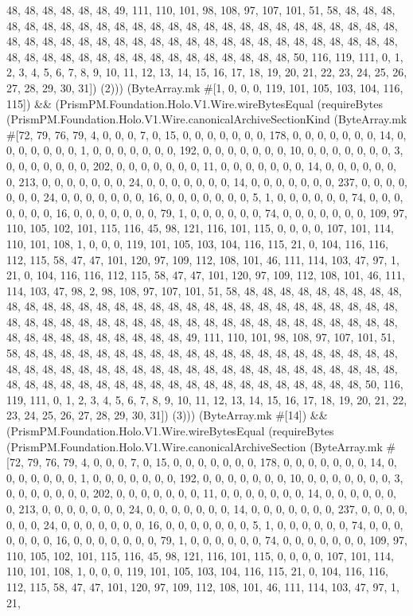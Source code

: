 \documentclass[11pt]{article}
\begin{document}
48, 48, 48, 48, 48, 48, 49, 111, 110, 101, 98, 108, 97, 107, 101, 51, 58, 48, 48, 48, 48, 48, 48, 48, 48, 48, 48, 48, 48, 48, 48, 48, 48, 48, 48, 48, 48, 48, 48, 48, 48, 48, 48, 48, 48, 48, 48, 48, 48, 48, 48, 48, 48, 48, 48, 48, 48, 48, 48, 48, 48, 48, 48, 48, 48, 48, 48, 48, 48, 48, 48, 48, 48, 48, 48, 48, 48, 48, 48, 48, 50, 116, 119, 111, 0, 1, 2, 3, 4, 5, 6, 7, 8, 9, 10, 11, 12, 13, 14, 15, 16, 17, 18, 19, 20, 21, 22, 23, 24, 25, 26, 27, 28, 29, 30, 31]) (2))) (ByteArray.mk \#[1, 0, 0, 0, 119, 101, 105, 103, 104, 116, 115]) \&\& (PrismPM.Foundation.Holo.V1.Wire.wireBytesEqual (requireBytes (PrismPM.Foundation.Holo.V1.Wire.canonicalArchiveSectionKind (ByteArray.mk \#[72, 79, 76, 79, 4, 0, 0, 0, 7, 0, 15, 0, 0, 0, 0, 0, 0, 0, 178, 0, 0, 0, 0, 0, 0, 0, 14, 0, 0, 0, 0, 0, 0, 0, 1, 0, 0, 0, 0, 0, 0, 0, 192, 0, 0, 0, 0, 0, 0, 0, 10, 0, 0, 0, 0, 0, 0, 0, 3, 0, 0, 0, 0, 0, 0, 0, 202, 0, 0, 0, 0, 0, 0, 0, 11, 0, 0, 0, 0, 0, 0, 0, 14, 0, 0, 0, 0, 0, 0, 0, 213, 0, 0, 0, 0, 0, 0, 0, 24, 0, 0, 0, 0, 0, 0, 0, 14, 0, 0, 0, 0, 0, 0, 0, 237, 0, 0, 0, 0, 0, 0, 0, 24, 0, 0, 0, 0, 0, 0, 0, 16, 0, 0, 0, 0, 0, 0, 0, 5, 1, 0, 0, 0, 0, 0, 0, 74, 0, 0, 0, 0, 0, 0, 0, 16, 0, 0, 0, 0, 0, 0, 0, 79, 1, 0, 0, 0, 0, 0, 0, 74, 0, 0, 0, 0, 0, 0, 0, 109, 97, 110, 105, 102, 101, 115, 116, 45, 98, 121, 116, 101, 115, 0, 0, 0, 0, 107, 101, 114, 110, 101, 108, 1, 0, 0, 0, 119, 101, 105, 103, 104, 116, 115, 21, 0, 104, 116, 116, 112, 115, 58, 47, 47, 101, 120, 97, 109, 112, 108, 101, 46, 111, 114, 103, 47, 97, 1, 21, 0, 104, 116, 116, 112, 115, 58, 47, 47, 101, 120, 97, 109, 112, 108, 101, 46, 111, 114, 103, 47, 98, 2, 98, 108, 97, 107, 101, 51, 58, 48, 48, 48, 48, 48, 48, 48, 48, 48, 48, 48, 48, 48, 48, 48, 48, 48, 48, 48, 48, 48, 48, 48, 48, 48, 48, 48, 48, 48, 48, 48, 48, 48, 48, 48, 48, 48, 48, 48, 48, 48, 48, 48, 48, 48, 48, 48, 48, 48, 48, 48, 48, 48, 48, 48, 48, 48, 48, 48, 48, 48, 48, 48, 49, 111, 110, 101, 98, 108, 97, 107, 101, 51, 58, 48, 48, 48, 48, 48, 48, 48, 48, 48, 48, 48, 48, 48, 48, 48, 48, 48, 48, 48, 48, 48, 48, 48, 48, 48, 48, 48, 48, 48, 48, 48, 48, 48, 48, 48, 48, 48, 48, 48, 48, 48, 48, 48, 48, 48, 48, 48, 48, 48, 48, 48, 48, 48, 48, 48, 48, 48, 48, 48, 48, 48, 48, 48, 50, 116, 119, 111, 0, 1, 2, 3, 4, 5, 6, 7, 8, 9, 10, 11, 12, 13, 14, 15, 16, 17, 18, 19, 20, 21, 22, 23, 24, 25, 26, 27, 28, 29, 30, 31]) (3))) (ByteArray.mk \#[14]) \&\& (PrismPM.Foundation.Holo.V1.Wire.wireBytesEqual (requireBytes (PrismPM.Foundation.Holo.V1.Wire.canonicalArchiveSection (ByteArray.mk \#[72, 79, 76, 79, 4, 0, 0, 0, 7, 0, 15, 0, 0, 0, 0, 0, 0, 0, 178, 0, 0, 0, 0, 0, 0, 0, 14, 0, 0, 0, 0, 0, 0, 0, 1, 0, 0, 0, 0, 0, 0, 0, 192, 0, 0, 0, 0, 0, 0, 0, 10, 0, 0, 0, 0, 0, 0, 0, 3, 0, 0, 0, 0, 0, 0, 0, 202, 0, 0, 0, 0, 0, 0, 0, 11, 0, 0, 0, 0, 0, 0, 0, 14, 0, 0, 0, 0, 0, 0, 0, 213, 0, 0, 0, 0, 0, 0, 0, 24, 0, 0, 0, 0, 0, 0, 0, 14, 0, 0, 0, 0, 0, 0, 0, 237, 0, 0, 0, 0, 0, 0, 0, 24, 0, 0, 0, 0, 0, 0, 0, 16, 0, 0, 0, 0, 0, 0, 0, 5, 1, 0, 0, 0, 0, 0, 0, 74, 0, 0, 0, 0, 0, 0, 0, 16, 0, 0, 0, 0, 0, 0, 0, 79, 1, 0, 0, 0, 0, 0, 0, 74, 0, 0, 0, 0, 0, 0, 0, 109, 97, 110, 105, 102, 101, 115, 116, 45, 98, 121, 116, 101, 115, 0, 0, 0, 0, 107, 101, 114, 110, 101, 108, 1, 0, 0, 0, 119, 101, 105, 103, 104, 116, 115, 21, 0, 104, 116, 116, 112, 115, 58, 47, 47, 101, 120, 97, 109, 112, 108, 101, 46, 111, 114, 103, 47, 97, 1, 21, 
\end{document}
